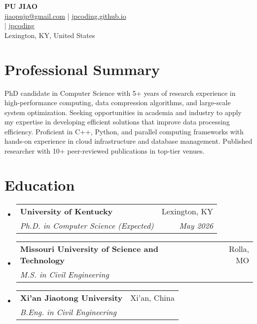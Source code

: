 \documentclass[a4paper,11pt]{article}
\makeatletter
\newcommand{\resumeSubheading}[4]{
\vspace{0.5mm}\item
    \begin{tabular*}{0.98\textwidth}[t]{l@{\extracolsep{\fill}}r}
        \textbf{#1} & #2 \\
        \textit{#3} & \textit{\footnotesize{#4}}\\
    \end{tabular*}
    \vspace{-2.4mm}
}
\newcommand{\resumeSubHeadingListStart}{\begin{itemize}[leftmargin=*,labelsep=1mm]}
\newcommand{\resumeSubHeadingListEnd}{\end{itemize}\vspace{2mm}}
\newcommand{\socialicon}[1]{\raisebox{-0.05em}{\resizebox{!}{1em}{#1}}}
\newcommand{\headerfontiii}{\fontfamily{ppl}\selectfont} %
\makeatother
\begin{document}
\headerfontiii

\begin{center}
    {\Huge\textbf{PU JIAO}}\\[0.5em]
    \small{
    \href{mailto:jiaopujp@gmail.com}{jiaopujp@gmail.com} | 
    \href{https://jpcoding.github.io/}{jpcoding.github.io}
    }\\[0.3em]
    \small{
    \socialicon{\faLinkedin} \href{https://www.linkedin.com/in/pu-jiao-4b309b212/}{ } | 
    \socialicon{\faGithub} \href{https://github.com/jpcoding}{jpcoding}
    }\\[0.2em]
    \small{Lexington, KY, United States}
\end{center}

\vspace{-4mm}

\section{\textbf{Professional Summary}}
\vspace{-0.4mm}
\small{
PhD candidate in Computer Science with 5+ years of research experience in high-performance computing, data compression algorithms, and large-scale system optimization. Seeking opportunities in academia and industry to apply my expertise in developing efficient solutions that improve data processing efficiency. Proficient in C++, Python, and parallel computing frameworks with hands-on experience in cloud infrastructure and database management. Published researcher with 10+ peer-reviewed publications in top-tier venues.
}
\vspace{-2mm}

\section{\textbf{Education}}
\vspace{-0.4mm}
\resumeSubHeadingListStart

\resumeSubheading
{University of Kentucky}{Lexington, KY}
{Ph.D. in Computer Science (Expected)}{May 2026}

\resumeSubheading
{Missouri University of Science and Technology}{Rolla, MO}
{M.S. in Civil Engineering}{}

\resumeSubheading
{Xi'an Jiaotong University}{Xi'an, China}
{B.Eng. in Civil Engineering}{}

\resumeSubHeadingListEnd
\vspace{-6mm}
\end{document}
